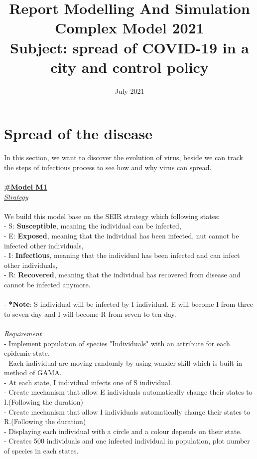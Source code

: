 \documentclass{article}
\title{Report Modelling And Simulation Complex Model 2021
        \linebreak
        \\Subject:  spread of COVID-19 in a city and control policy}
\date{July 2021}
\begin{document}
\newpage
\section{Spread of the disease}
In this section, we want to discover the evolution of virus, beside we can track the steps of infectious process to see how and why virus can spread.
\\
\\
\underline{\textbf{#Model M1}}
\\
\underline{\emph{Strategy}}\\\\
We build this model base on the SEIR strategy which following states:\\
- S: \textbf{Susceptible}, meaning the individual can be infected,\\
- E: \textbf{Exposed}, meaning that the individual has been infected, nut cannot be infected other individuals,\\
- I: \textbf{Infectious}, meaning that the individual has been infected and can infect other individuals,\\
- R: \textbf{Recovered}, meaning that the individual has recovered from disease and cannot be infected anymore.\\\\
- \textbf{*Note}: S individual will be infected by I individual. E will become I from three to seven day and I will become R from seven to ten day.
\\\\
\underline{\emph{Requirement}}\\
- Implement population of species "Individuals" with an attribute for each epidemic state.\\
- Each individual are moving randomly by using wander skill which is built in method of GAMA.\\ 
- At each state, I individual infects one of S individual.\\
- Create mechanism that allow E individuals automatically change their  states to I.(Following the duration)\\
- Create mechanism that allow I individuals automatically change their  states to R.(Following the duration)\\
- Displaying each individual with a circle and a colour depends on their state.\\
- Creates 500 individuals and one infected individual in population, plot number of species in each states.\\
\end{document}
